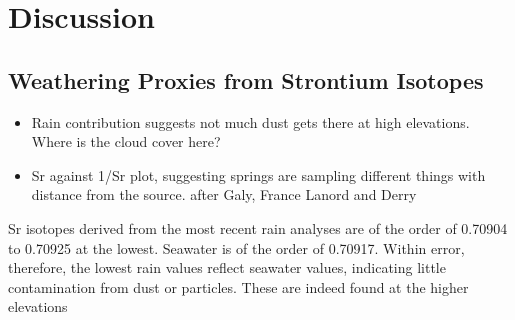 

\section{Discussion}














\subsection{Weathering Proxies from Strontium Isotopes}

\begin{itemize}
    \item Rain contribution suggests not much dust gets there at high elevations. Where is the cloud cover here?
    \item Sr against 1/Sr plot, suggesting springs are sampling different things with distance from the source. after Galy, France Lanord and Derry
\end{itemize}

Sr isotopes derived from the most recent rain analyses are of the order of 0.70904 to 0.70925 at the lowest. Seawater is of the order of 0.70917. Within error, therefore, the lowest rain values reflect seawater values, indicating little contamination from dust or particles. These are indeed found at the higher elevations \\


